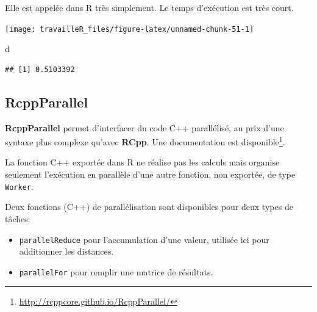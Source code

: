 \documentclass[
  11pt,
  french,
  a4paper,
  extrafontsizes,onecolumn,openright
  ]{memoir}
\newenvironment{Shaded}{\begin{snugshade}}{\end{snugshade}}
\newcommand{\CommentTok}[1]{\textcolor[rgb]{0.56,0.35,0.01}{\textit{#1}}}
\newcommand{\FunctionTok}[1]{\textcolor[rgb]{0.00,0.00,0.00}{#1}}
\newcommand{\NormalTok}[1]{#1}
\newcommand{\OtherTok}[1]{\textcolor[rgb]{0.56,0.35,0.01}{#1}}
\newcommand{\SpecialCharTok}[1]{\textcolor[rgb]{0.00,0.00,0.00}{#1}}
\providecommand{\tightlist}{%
  \setlength{\itemsep}{0pt}\setlength{\parskip}{0pt}}
\begin{document}
\normalsize

Elle est appelée dans R très simplement.
Le temps d'exécution est très court.

\scriptsize

\begin{Shaded}
\end{Shaded}

\begin{center}\texttt{[image: travailleR\_files/figure-latex/unnamed-chunk-51-1]} \end{center}

\begin{Shaded}
\begin{Highlighting}[]
\NormalTok{d}
\end{Highlighting}
\end{Shaded}

\begin{verbatim}
## [1] 0.5103392
\end{verbatim}

\normalsize

\hypertarget{rcppparallel}{%
\subsection{RcppParallel}\label{rcppparallel}}

\textbf{RcppParallel} permet d'interfacer du code C++ parallélisé, au prix d'une syntaxe plus complexe qu'avec \textbf{RCpp}.
Une documentation est disponible\footnote{\url{http://rcppcore.github.io/RcppParallel/}}.

La fonction C++ exportée dans R ne réalise pas les calculs mais organise seulement l'exécution en parallèle d'une autre fonction, non exportée, de type \texttt{Worker}.

Deux fonctions (C++) de parallélisation sont disponibles pour deux types de tâches:

\begin{itemize}
\tightlist
\item
  \texttt{parallelReduce} pour l'accumulation d'une valeur, utilisée ici pour additionner les distances.
\item
  \texttt{parallelFor} pour remplir une matrice de résultats.
\end{itemize}
\end{document}
